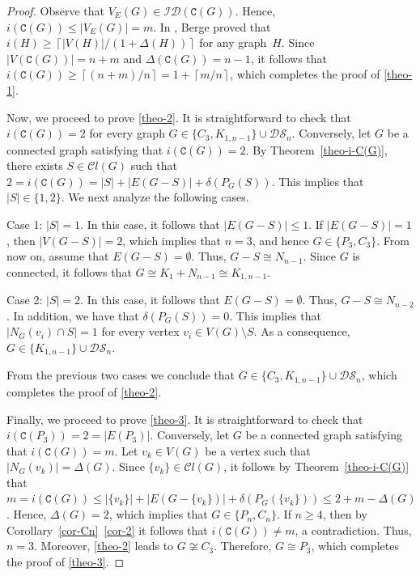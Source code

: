 \documentclass[12pt]{article}
\begin{document}
\begin{proof}
Observe that $V_E(G)\in \mathcal{ID}(\mathtt{C}(G))$. Hence, $i(\mathtt{C}(G))\leq |V_E(G)|=m$. In \cite{Berge1973}, Berge proved that $i(H)\geq \left\lceil |V(H)|/(1+\Delta(H))\right\rceil$ for any graph~$H$. Since $|V(\mathtt{C}(G))|=n+m$ and $\Delta(\mathtt{C}(G))=n-1$, it follows that $i(\mathtt{C}(G))\geq \left\lceil (n+m)/n\right\rceil=1+\left\lceil m/n\right\rceil$, which completes the proof of \ref{theo-1}.

\vspace{.1cm}

\noindent
Now, we proceed to prove \ref{theo-2}. It is straightforward to check that $i(\mathtt{C}(G))=2$ for every graph $G\in \{C_3,K_{1,n-1}\}\cup \mathcal{DS}_n$. Conversely, let $G$ be a connected graph satisfying that $i(\mathtt{C}(G))=2$. By Theorem~\ref{theo-i-C(G)}, there exists $S\in \mathcal{C}l(G)$ such that  
$2=i(\mathtt{C}(G))=|S|+|E(G-S)|+\delta(P_{G}(S))$. This implies that $|S|\in \{1,2\}$. We next analyze the following cases.

\vspace{.1cm}

\noindent
Case 1: $|S|=1$. In this case, it follows that $|E(G-S)|\leq 1$. If $|E(G-S)|=1$, then $|V(G-S)|=2$, which implies that $n=3$, and hence $G\in \{P_3,C_3\}$. From now on, assume that $E(G-S)=\emptyset$. Thus, $G-S\cong N_{n-1}$. Since $G$ is connected, it follows that $G\cong K_1+N_{n-1}\cong K_{1,n-1}$.

\vspace{.1cm}

\noindent
Case 2: $|S|=2$. In this case, it follows that $E(G-S)=\emptyset$. Thus, $G-S\cong N_{n-2}$. In addition, we have that $\delta(P_{G}(S))=0$. This implies that $|N_G(v_i)\cap S|=1$ for every vertex $v_i\in V(G)\setminus S$. As a consequence, $G\in \{K_{1,n-1}\}\cup \mathcal{DS}_n$.

\vspace{.1cm}

\noindent
From the previous two cases we conclude that $G\in \{C_3,K_{1,n-1}\}\cup \mathcal{DS}_n$, which completes the proof of \ref{theo-2}. 

\vspace{.1cm}

\noindent
Finally, we proceed to prove \ref{theo-3}. It is straightforward to check that $i(\mathtt{C}(P_3))=2=|E(P_3)|$. Conversely, let $G$ be a connected graph satisfying that $i(\mathtt{C}(G))=m$. Let $v_k\in V(G)$ be a vertex such that $|N_G(v_k)|=\Delta(G)$. Since $\{v_k\}\in \mathcal{C}l(G)$, it follows by Theorem~\ref{theo-i-C(G)} that
$m=i(\mathtt{C}(G))\leq |\{v_k\}|+|E(G-\{v_k\})|+\delta(P_{G}(\{v_k\}))\leq 2+m-\Delta(G)$. Hence, $\Delta(G)=2$, which implies that $G\in \{P_n,C_n\}$. If $n\geq 4$, then by Corollary~\ref{cor-Cn}~\ref{cor-2} it follows that $i(\mathtt{C}(G))\neq m$, a contradiction. Thus, $n=3$. Moreover, \ref{theo-2} leads to $G\not\cong C_3$. Therefore, $G\cong P_3$, which completes the proof of \ref{theo-3}.
\end{proof}
\end{document}
